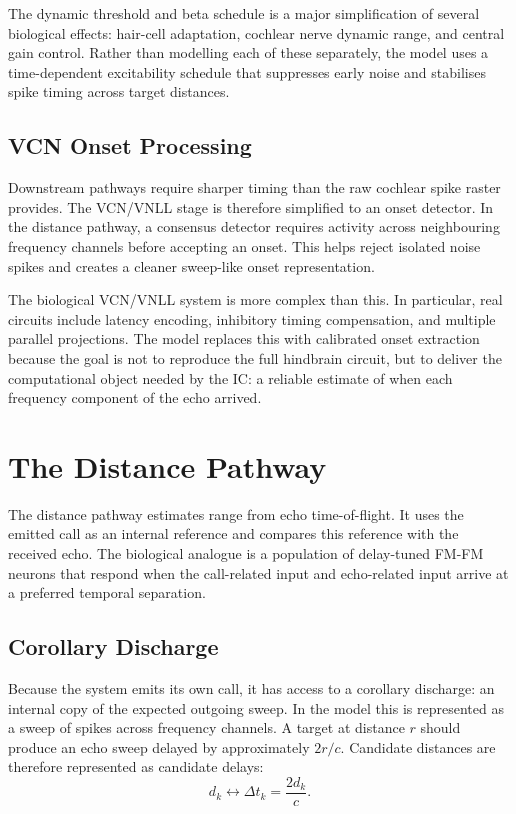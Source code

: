 The dynamic threshold and beta schedule is a major simplification of several biological effects: hair-cell adaptation, cochlear nerve dynamic range, and central gain control. Rather than modelling each of these separately, the model uses a time-dependent excitability schedule that suppresses early noise and stabilises spike timing across target distances.

\subsection{VCN Onset Processing}

Downstream pathways require sharper timing than the raw cochlear spike raster provides. The VCN/VNLL stage is therefore simplified to an onset detector. In the distance pathway, a consensus detector requires activity across neighbouring frequency channels before accepting an onset. This helps reject isolated noise spikes and creates a cleaner sweep-like onset representation.

The biological VCN/VNLL system is more complex than this. In particular, real circuits include latency encoding, inhibitory timing compensation, and multiple parallel projections. The model replaces this with calibrated onset extraction because the goal is not to reproduce the full hindbrain circuit, but to deliver the computational object needed by the IC: a reliable estimate of when each frequency component of the echo arrived.

\section{The Distance Pathway}

The distance pathway estimates range from echo time-of-flight. It uses the emitted call as an internal reference and compares this reference with the received echo. The biological analogue is a population of delay-tuned FM-FM neurons that respond when the call-related input and echo-related input arrive at a preferred temporal separation.

\subsection{Corollary Discharge}

Because the system emits its own call, it has access to a corollary discharge: an internal copy of the expected outgoing sweep. In the model this is represented as a sweep of spikes across frequency channels. A target at distance $r$ should produce an echo sweep delayed by approximately $2r/c$. Candidate distances are therefore represented as candidate delays:
\begin{equation}
    d_k \leftrightarrow \Delta t_k = \frac{2d_k}{c}.
\end{equation}

